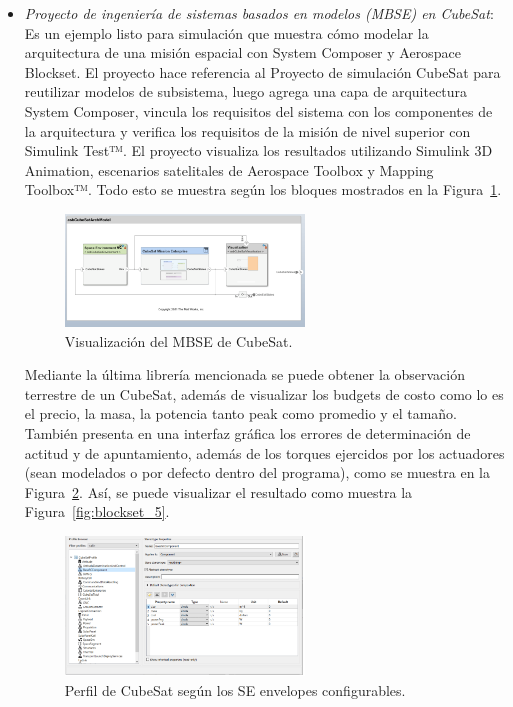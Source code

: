 \begin{itemize}
	\item \textit{Proyecto de ingeniería de sistemas basados en modelos (MBSE) en CubeSat}: Es un ejemplo listo para simulación que muestra cómo modelar la arquitectura de una misión espacial con System Composer y Aerospace Blockset. El proyecto hace referencia al Proyecto de simulación CubeSat para reutilizar modelos de subsistema, luego agrega una capa de arquitectura System Composer, vincula los requisitos del sistema con los componentes de la arquitectura y verifica los requisitos de la misión de nivel superior con Simulink Test™. El proyecto visualiza los resultados utilizando Simulink 3D Animation, escenarios satelitales de Aerospace Toolbox y Mapping Toolbox™. Todo esto se muestra según los bloques mostrados en la Figura~\ref{fig:blockset_3}.
	
	\begin{figure}[H]
		\centering    
		\includegraphics[width=0.6\textwidth]{blockset_3.png}
		\caption{Visualización del MBSE de CubeSat.}
		\label{fig:blockset_3}
	\end{figure}	
	
	Mediante la última librería mencionada se puede obtener la observación terrestre de un CubeSat, además de visualizar los budgets de costo como lo es el precio, la masa, la potencia tanto peak como promedio y el tamaño. También presenta en una interfaz gráfica los errores de determinación de actitud y de apuntamiento, además de los torques ejercidos por los actuadores (sean modelados o por defecto dentro del programa), como se muestra en la Figura~\ref{fig:blockset_4}. Así, se puede visualizar el resultado como muestra la Figura~\ref{fig:blockset_5}.
	
	\begin{figure}[H]
		\centering    
		\includegraphics[width=0.6\textwidth]{blockset_4.png}
		\caption{Perfil de CubeSat según los SE envelopes configurables.}
		\label{fig:blockset_4}
	\end{figure}	
	

\end{itemize}
